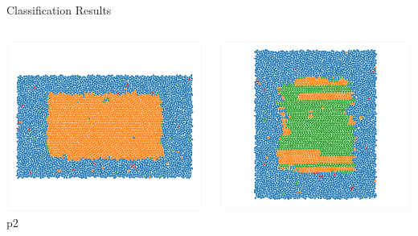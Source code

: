 \documentclass[aspectratio=169, 14pt]{beamer}
\begin{document}
\begin{frame}{Classification Results}
  \begin{columns}
    \begin{column}{0.33\textwidth}
      \center
      \includegraphics[width=\textwidth]{classification_results_p2.png}
      p2
    \end{column}
    \begin{column}{0.33\textwidth}
      \center
      \includegraphics[width=\textwidth]{classification_results_p2gg.png}

\end{column}
\end{columns}
\end{frame}
\end{document}
